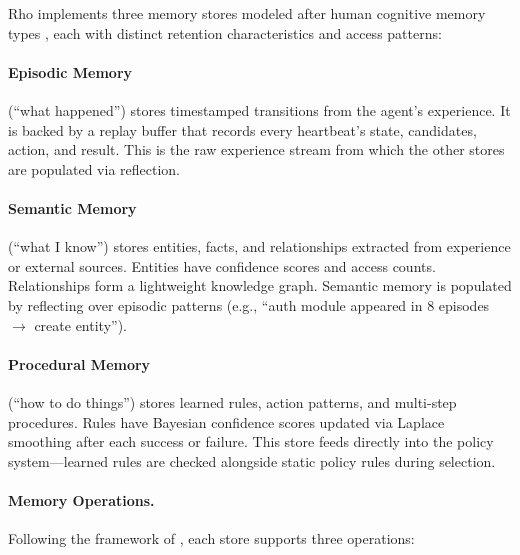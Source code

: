 \documentclass[letterpaper]{article}
\begin{document}
Rho implements three memory stores modeled after human cognitive memory types \citep{tulving1972episodic}, each with distinct retention characteristics and access patterns:

\paragraph{Episodic Memory} (``what happened'') stores timestamped transitions from the agent's experience. It is backed by a replay buffer that records every heartbeat's state, candidates, action, and result. This is the raw experience stream from which the other stores are populated via reflection.

\paragraph{Semantic Memory} (``what I know'') stores entities, facts, and relationships extracted from experience or external sources. Entities have confidence scores and access counts. Relationships form a lightweight knowledge graph. Semantic memory is populated by reflecting over episodic patterns (e.g., ``auth module appeared in 8 episodes $\rightarrow$ create entity'').

\paragraph{Procedural Memory} (``how to do things'') stores learned rules, action patterns, and multi-step procedures. Rules have Bayesian confidence scores updated via Laplace smoothing after each success or failure. This store feeds directly into the policy system---learned rules are checked alongside static policy rules during selection.

\paragraph{Memory Operations.} Following the framework of \citet{zhang2024survey}, each store supports three operations:
\end{document}
